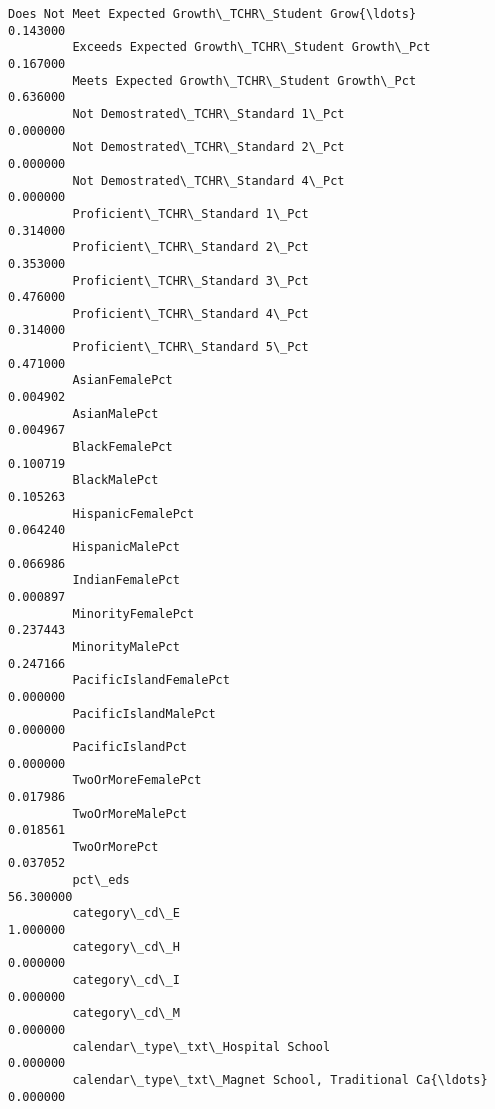 \documentclass[11pt]{article}
\begin{document}
\begin{Verbatim}[commandchars=\\\{\}]
         Does Not Meet Expected Growth\_TCHR\_Student Grow{\ldots}       0.143000   
         Exceeds Expected Growth\_TCHR\_Student Growth\_Pct          0.167000   
         Meets Expected Growth\_TCHR\_Student Growth\_Pct            0.636000   
         Not Demostrated\_TCHR\_Standard 1\_Pct                      0.000000   
         Not Demostrated\_TCHR\_Standard 2\_Pct                      0.000000   
         Not Demostrated\_TCHR\_Standard 4\_Pct                      0.000000   
         Proficient\_TCHR\_Standard 1\_Pct                           0.314000   
         Proficient\_TCHR\_Standard 2\_Pct                           0.353000   
         Proficient\_TCHR\_Standard 3\_Pct                           0.476000   
         Proficient\_TCHR\_Standard 4\_Pct                           0.314000   
         Proficient\_TCHR\_Standard 5\_Pct                           0.471000   
         AsianFemalePct                                           0.004902   
         AsianMalePct                                             0.004967   
         BlackFemalePct                                           0.100719   
         BlackMalePct                                             0.105263   
         HispanicFemalePct                                        0.064240   
         HispanicMalePct                                          0.066986   
         IndianFemalePct                                          0.000897   
         MinorityFemalePct                                        0.237443   
         MinorityMalePct                                          0.247166   
         PacificIslandFemalePct                                   0.000000   
         PacificIslandMalePct                                     0.000000   
         PacificIslandPct                                         0.000000   
         TwoOrMoreFemalePct                                       0.017986   
         TwoOrMoreMalePct                                         0.018561   
         TwoOrMorePct                                             0.037052   
         pct\_eds                                                 56.300000   
         category\_cd\_E                                            1.000000   
         category\_cd\_H                                            0.000000   
         category\_cd\_I                                            0.000000   
         category\_cd\_M                                            0.000000   
         calendar\_type\_txt\_Hospital School                        0.000000   
         calendar\_type\_txt\_Magnet School, Traditional Ca{\ldots}       0.000000   

\end{Verbatim}
\end{document}
